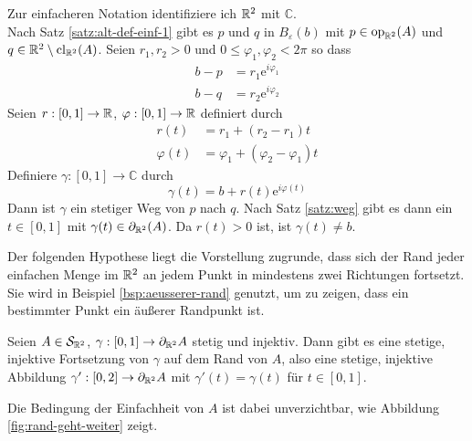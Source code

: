     \begin{bew}
        Zur einfacheren Notation identifiziere ich $\mathbb{R}^2$ mit $\mathbb{C}$.\\
        Nach Satz \ref{satz:alt-def-einf-1} gibt es $p$ und $q$ in $B_\varepsilon(b)$ mit $p \in \text{op}_{\mathbb{R}^2}(A)$ und $q \in \mathbb{R}^2 \setminus \text{cl}_{\mathbb{R}^2}(A)$. Seien $r_1, r_2 > 0$ und $0 \leq \varphi_1, \varphi_2 < 2\pi$ so dass 
        \begin{align*}
            b-p &= r_1 \text{e}^{i \varphi_1}\\
            b-q &= r_2 \text{e}^{i \varphi_2}
        \end{align*}
        Seien $r: [0,1] \to \mathbb{R}$, $\varphi: [0,1] \to \mathbb{R}$ definiert durch
        \begin{align*}
            r(t) &= r_1 + (r_2 - r_1)t\\
            \varphi(t) &= \varphi_1 + (\varphi_2 - \varphi_1)t
        \end{align*}
        Definiere $\gamma: [0,1] \to \mathbb{C}$ durch
        \[\gamma(t) = b + r(t) \text{e}^{i \varphi(t)}\]
        Dann ist $\gamma$ ein stetiger Weg von $p$ nach $q$. Nach Satz \ref{satz:weg} gibt es dann ein $t \in [0,1]$ mit $\gamma(t) \in \partial_{\mathbb{R}^2}(A)$. Da $r(t) > 0$ ist, ist $\gamma(t) \neq b$.
    \end{bew}
%     
%    
    Der folgenden Hypothese liegt die Vorstellung zugrunde, dass sich der Rand jeder einfachen Menge im $\mathbb{R}^2$ an jedem Punkt in mindestens zwei Richtungen fortsetzt.
    Sie wird in Beispiel \ref{bsp:aeusserer-rand} genutzt, um zu zeigen, dass ein bestimmter Punkt ein äußerer Randpunkt ist.
%
    \begin{hyp}\label{hyp:rand-geht-weiter}
        Seien $A \in \mathcal{S}_{\mathbb{R}^2}$, $\gamma : [0,1] \to \partial_{\mathbb{R}^2} A$ stetig und injektiv.
        Dann gibt es eine stetige, injektive Fortsetzung von $\gamma$ auf dem Rand von $A$, 
        also eine stetige, injektive Abbildung $\gamma' : [0,2] \to \partial_{\mathbb{R}^2} A$ mit $\gamma'(t) = \gamma(t)$ für $t \in [0,1]$.
    \end{hyp}
%
    Die Bedingung der Einfachheit von $A$ ist dabei unverzichtbar, wie Abbildung \ref{fig:rand-geht-weiter} zeigt.
